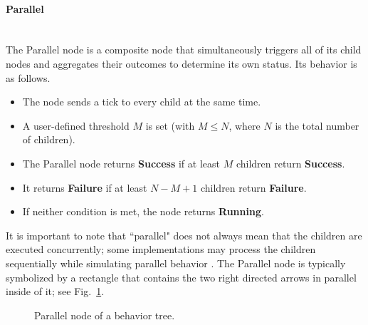\documentclass{CSSRforAfrica}
\begin{document}
\paragraph{Parallel}~\\
The Parallel node is a composite node that simultaneously triggers all of its child nodes and aggregates their outcomes to determine its own status. Its behavior is as follows.
\begin{itemize}
    \item The node sends a tick to every child at the same time.
    \item A user-defined threshold \(M\) is set (with \(M \leq N\), where \(N\) is the total number of children). 
    \item The Parallel node returns \textbf{Success} if at least \(M\) children return \textbf{Success}.
    \item It returns \textbf{Failure} if at least \(N - M + 1\) children return \textbf{Failure}.
    \item If neither condition is met, the node returns \textbf{Running}.
\end{itemize}
It is important to note that ``parallel" does not always mean that the children are executed concurrently; some implementations may process the children sequentially while simulating parallel behavior \cite{Ghzoulietal2020,FacontiGithubComment}.
The Parallel node is typically symbolized by a rectangle that contains the two right directed arrows in parallel inside of it; see Fig.~\ref{fig:parallel}.


\begin{figure}[th]
\vspace{5mm}
    \centering
    \caption{Parallel node of a behavior tree.}
   \label{fig:parallel}
\end{figure}
\end{document}
